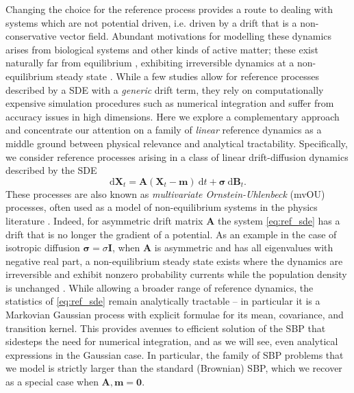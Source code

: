 \documentclass{article}
\newcommand{\diff}{\mathrm{d}}
\newcommand{\Id}{\mathbf{I}}
\theoremstyle{newstyle}
\begin{document}
Changing the choice for the reference process provides a route to dealing with systems which are not potential driven, i.e. driven by a drift that is a non-conservative vector field. Abundant motivations for modelling these dynamics arises from biological systems and other kinds of active matter; these exist naturally far from equilibrium \cite{zhu2024uncovering, parrondo2009entropy, gnesotto2018broken, fang2019nonequilibrium}, exhibiting irreversible dynamics at a non-equilibrium steady state \cite{lax1960fluctuations}. While a few studies \cite{vargas2021solving, shen2024multi, koshizuka2022neural} allow for reference processes described by a SDE with a \emph{generic} drift term, they rely on computationally expensive simulation procedures such as numerical integration and suffer from accuracy issues in high dimensions.
Here we explore a complementary approach and concentrate our attention on a family of \emph{linear} reference dynamics as a middle ground between physical relevance and analytical tractability. Specifically, we consider reference processes arising in a class of linear drift-diffusion dynamics described by the SDE
\begin{equation}
  \diff \bm{X}_t = \bm{A} ( \bm{X}_t - \bm{m}) \: \diff t + \bm{\sigma} \: \diff \bm{B}_t. \label{eq:ref_sde}
\end{equation}
These processes are also known as \emph{multivariate Ornstein-Uhlenbeck} (mvOU) processes, often used as a model of non-equilibrium systems in the physics literature \cite{lax1960fluctuations, godreche2018characterising, gilson2023entropy}. Indeed, for asymmetric drift matrix $\bm{A}$ the system \eqref{eq:ref_sde} has a drift that is no longer the gradient of a potential.
As an example in the case of isotropic diffusion $\bm{\sigma} = \sigma \Id$, when $\bm{A}$ is asymmetric and has all eigenvalues with negative real part, a non-equilibrium steady state exists where the dynamics are irreversible and exhibit nonzero probability currents while the population density is unchanged \cite{gilson2023entropy, godreche2018characterising}. While allowing a broader range of reference dynamics, the statistics of \eqref{eq:ref_sde} remain analytically tractable -- in particular it is a Markovian Gaussian process with explicit formulae for its mean, covariance, and transition kernel. This provides avenues to efficient solution of the SBP that sidesteps the need for numerical integration, and as we will see, even analytical expressions in the Gaussian case. 
In particular, the family of SBP problems that we model is strictly larger than the standard (Brownian) SBP, which we recover as a special case when $\bm{A}, \bm{m} = \bm{0}$.
\end{document}
